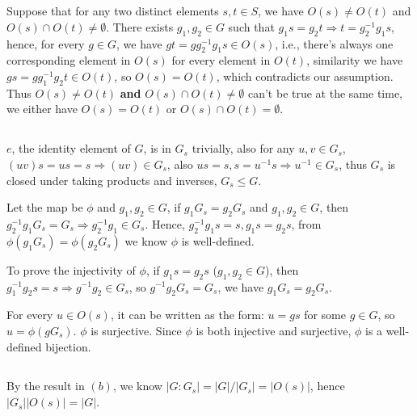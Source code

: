 \documentclass[12pt]{article}
\title{\mytitle}
\author{\textbf{\myauthor}}
\date{}
\begin{document}
\onehalfspacing
\maketitle

\section{}
\subsection{}
Suppose that for any two distinct elements $s,t\in S$, we have $O(s)\ne O(t)$ and $O(s)\cap O(t)\ne\emptyset$. There exists $g_1,g_2\in G$ such that $g_1s=g_2t\Rightarrow t=g_2^{-1}g_1s$, hence, for every $g\in G$, we have $gt=gg_2^{-1}g_1s\in O(s)$, i.e., there's always one corresponding element in $O(s)$ for every element in $O(t)$, similarity we have $gs=gg_1^{-1}g_2t\in O(t)$, so $O(s)=O(t)$, which contradicts our assumption. Thus $O(s)\ne O(t)$ \textbf{and} $O(s)\cap O(t)\ne\emptyset$ can't be true at the same time, we either have $O(s)=O(t)$ or $O(s)\cap O(t)=\emptyset$.
\subsection{}
$e$, the identity element of $G$, is in $G_s$ trivially, also for any $u,v\in G_s$, $(uv)s=us=s\Rightarrow (uv)\in G_s$, also $us=s,s=u^{-1}s\Rightarrow u^{-1}\in G_s$, thus $G_s$ is closed under taking products and inverses, $G_s\le G$.

Let the map be $\phi$ and $g_1,g_2\in G$, if $g_1G_s=g_2G_s$ and $g_1,g_2\in G$, then $g_2^{-1}g_1G_s=G_s\Rightarrow g_2^{-1}g_1\in G_s$. Hence, $g_2^{-1}g_1s=s, g_1s=g_2s$, from $\phi(g_1G_s)=\phi(g_2G_s)$ we know $\phi$ is well-defined.

To prove the injectivity of $\phi$, if $g_1s=g_2s$ ($g_1,g_2\in G$), then $g_1^{-1}g_2s=s\Rightarrow g^{-1}g_2\in G_s$, so $g^{-1}g_2G_s=G_s$, we have $g_1G_s=g_2G_s$.

For every $u\in O(s)$, it can be written as the form: $u=gs$ for some $g\in G$, so $u=\phi(gG_s)$. $\phi$ is surjective. Since $\phi$ is both injective and surjective, $\phi$ is a well-defined bijection.
\subsection{}
By the result in $(b)$, we know $|G:G_s|=|G|/|G_s|=|O(s)|$, hence $|G_s||O(s)|=|G|$.
\end{document}
